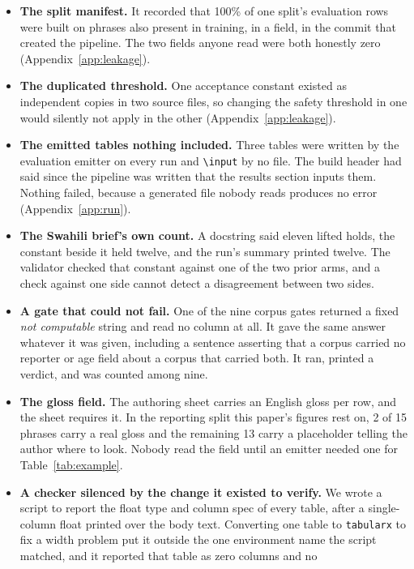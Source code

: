 \begin{itemize}\setlength{\itemsep}{1pt}
\item \textbf{The split manifest.} It recorded that 100\% of one split's
  evaluation rows were built on phrases also present in training, in a field, in
  the commit that created the pipeline. The two fields anyone read were both
  honestly zero (Appendix~\ref{app:leakage}).
\item \textbf{The duplicated threshold.} One acceptance constant existed as
  independent copies in two source files, so changing the safety threshold in one
  would silently not apply in the other (Appendix~\ref{app:leakage}).
\item \textbf{The emitted tables nothing included.} Three tables were written
  by the evaluation emitter on every run and \texttt{\textbackslash input} by no
  file. The build header had said since the pipeline was written that the results
  section inputs them. Nothing failed, because a generated file nobody reads
  produces no error (Appendix~\ref{app:run}).
\item \textbf{The Swahili brief's own count.} A docstring said eleven lifted
  holds, the constant beside it held twelve, and the run's summary printed twelve.
  The validator checked that constant against one of the two prior arms, and a
  check against one side cannot detect a disagreement between two sides.
\item \textbf{A gate that could not fail.} One of the nine corpus gates
  returned a fixed \emph{not computable} string and read no column at all. It
  gave the same answer whatever it was given, including a sentence asserting that
  a corpus carried no reporter or age field about a corpus that carried both. It
  ran, printed a verdict, and was counted among nine.
\item \textbf{The gloss field.} The authoring sheet carries an English gloss per
  row, and the sheet requires it. In the reporting split this paper's figures rest
  on, 2 of 15 phrases carry a real gloss and the remaining 13 carry a placeholder
  telling the author where to look. Nobody read the field until an emitter needed
  one for Table~\ref{tab:example}.
\item \textbf{A checker silenced by the change it existed to verify.} We wrote a
  script to report the float type and column spec of every table, after a
  single-column float printed over the body text. Converting one table to
  \texttt{tabularx} to fix a width problem put it outside the one environment
  name the script matched, and it reported that table as zero columns and no

\end{itemize}
